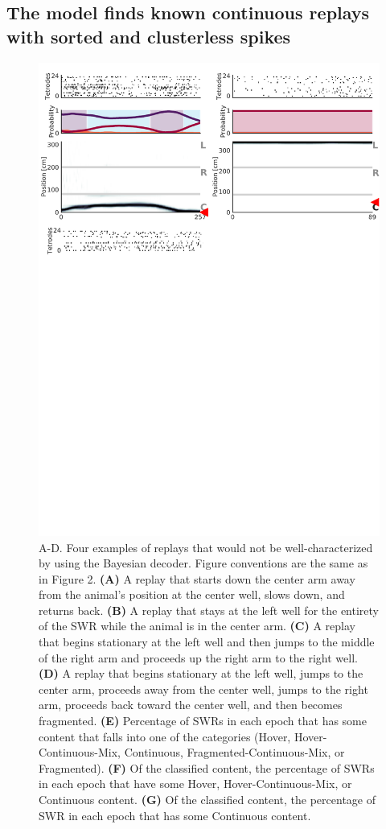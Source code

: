 \documentclass[times, twoside]{zHenriquesLab-StyleBioRxiv}
\begin{document}
\subsection*{The model finds known continuous replays with sorted and clusterless spikes}

\begin{figure}%
\centering
\includegraphics[width=0.80\linewidth]{figures/Figure3/Figure3_v3}
\caption{A-D. Four examples of replays that would not be well-characterized by using the Bayesian decoder. Figure conventions are the same as in Figure 2. \textbf{(A)} A replay that starts down the center arm away from the animal's position at the center well, slows down, and returns back. \textbf{(B)} A replay that stays at the left well for the entirety of the SWR while the animal is in the center arm. \textbf{(C)} A replay that begins stationary at the left well and then jumps to the middle of the right arm and proceeds up the right arm to the right well. \textbf{(D)} A replay that begins stationary at the left well, jumps to the center arm, proceeds away from the center well, jumps to the right arm, proceeds back toward the center well, and then becomes fragmented. \textbf{(E)} Percentage of SWRs in each epoch that has some content that falls into one of the categories (Hover, Hover-Continuous-Mix, Continuous, Fragmented-Continuous-Mix, or Fragmented). \textbf{(F)} Of the classified content, the percentage of SWRs in each epoch that have some Hover, Hover-Continuous-Mix, or Continuous content. \textbf{(G)} Of the classified content, the percentage of SWR in each epoch that has some Continuous content.
}
\label{3}
\end{figure}
\end{document}
